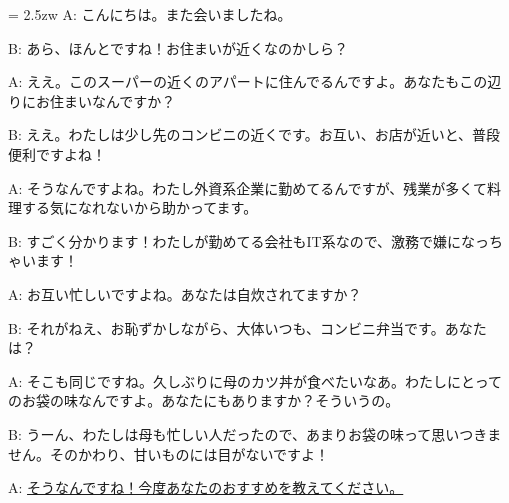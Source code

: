 \documentclass[11pt]{amsart}
\title{}
\author{}
\newenvironment{hangall}[1]{\hangindent = 2.5zw\everypar{\hangindent = 2.5zw}}{}
\begin{document}
\maketitle
\begin{hangall}{}%
A: こんにちは。また会いましたね。

B: あら、ほんとですね！お住まいが近くなのかしら？

A: ええ。このスーパーの近くのアパートに住んでるんですよ。あなたもこの辺りにお住まいなんですか？

B: ええ。わたしは少し先のコンビニの近くです。お互い、お店が近いと、普段便利ですよね！

A: そうなんですよね。わたし外資系企業に勤めてるんですが、残業が多くて料理する気になれないから助かってます。

B: すごく分かります！わたしが勤めてる会社もIT系なので、激務で嫌になっちゃいます！

A: お互い忙しいですよね。あなたは自炊されてますか？

B: それがねえ、お恥ずかしながら、大体いつも、コンビニ弁当です。あなたは？

A: そこも同じですね。久しぶりに母のカツ丼が食べたいなあ。わたしにとってのお袋の味なんですよ。あなたにもありますか？そういうの。

B: うーん、わたしは母も忙しい人だったので、あまりお袋の味って思いつきません。そのかわり、甘いものには目がないですよ！

A: \ul{そうなんですね！今度あなたのおすすめを教えてください。}\end{hangall}
\end{document}
